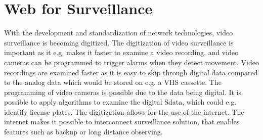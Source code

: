 \section{Web for Surveillance}
With the development and standardization of network technologies, video surveillance is becoming digitized.
The digitization of video surveillance is important as it e.g. makes it faster to examine a video recording, and video cameras can be programmed to trigger alarms when they detect movement.
Video recordings are examined faster as it is easy to skip through digital data compared to the analog data which would be stored on e.g. a VHS cassette.
The programming of video cameras is possible due to the data being digital. 
It is possible to apply algorithms to examine the digital Sdata, which could e.g. identify license plates.
The digitization allows for the use of the internet.
The internet makes it possible to interconnect surveillance solution, that enables features such as backup or long distance observing.